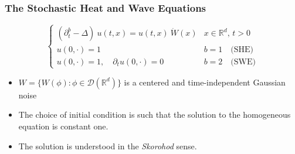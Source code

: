 \documentclass{beamer}%
\numberwithin{equation}{section}
\newcommand{\R}{\mathbb{R}}
\begin{document}
	
	
	
	
	
	
	
	\begin{frame}[t]%
		\frametitle{The Stochastic Heat and Wave Equations}
		
		\begin{equation*}
		\begin{cases}
		\left(\partial^b_t  -\Delta \right)\: u(t,x) =  u(t,x)\: \dot W(x) & \text{$x\in \R^d$, $t>0$} \\
		u(0,\cdot) = 1                                                     & b=1 \quad \text{(SHE)}    \\
		u(0,\cdot) = 1, \quad \partial_t u(0,\cdot) = 0                    & b=2 \quad \text{(SWE)}
		\end{cases}
		\end{equation*}
		
		\vfill
		\begin{itemize}
			\item $W = \{ W(\phi) : \phi \in \mathcal{D}(\R^d) \}$ is a centered and time-independent Gaussian noise
			\bigskip
			\item The choice of initial condition is such that the solution to the homogeneous equation is constant one.
			\bigskip
			\item The solution is understood in the {\it Skorohod} sense.
		\end{itemize}
		
	\end{frame}%
\end{document}
